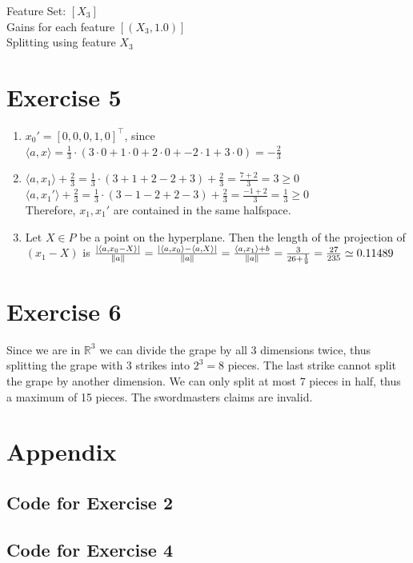 \documentclass[12pt]{article}
\DeclarePairedDelimiter\abs{\lvert}{\rvert}
\DeclarePairedDelimiter\Abs{\lVert}{\rVert}
\begin{document}
Feature Set: $[X_3]$ \\
Gains for each feature $[(X_3, 1.0)]$ \\
Splitting using feature $X_3$ \\

\section*{Exercise 5}
\begin{enumerate}[label=(\alph*)]
	\item	$x_0' = [0, 0, 0, 1, 0]^\top$, since $\langle a,x \rangle = \frac{1}{3} \cdot (3 \cdot 0 + 1 \cdot 0 + 2 \cdot 0 + -2 \cdot 1 + 3 \cdot 0) = -\frac{2}{3}$
	\item	$\langle a,x_1 \rangle + \frac{2}{3} = \frac{1}{3} \cdot (3+1+2-2+3) + \frac{2}{3} = \frac{7+2}{3} = 3 \geq 0$ \\
			$\langle a,x_1' \rangle + \frac{2}{3} = \frac{1}{3} \cdot (3-1-2+2-3) + \frac{2}{3} = \frac{-1+2}{3} = \frac{1}{3} \geq 0$ \\
			Therefore, $x_1,x_1'$ are contained in the same halfspace.
	\item	Let $X \in P$ be a point on the hyperplane. Then the length of the projection of $(x_1 - X)$ is $\frac{\abs{\langle a,x_0 - X \rangle}}{\Abs{a}} = \frac{\abs{\langle a,x_0 \rangle - \langle a,X \rangle}}{\Abs{a}} = \frac{\langle a,x_1 \rangle + b}{\Abs{a}} = \frac{3}{26 + \frac{1}{9}} = \frac{27}{235} \simeq 0.11489$
\end{enumerate}

\section*{Exercise 6}
Since we are in $\mathbb{R}^3$ we can divide the grape by all 3 dimensions twice, thus splitting the grape with 3 strikes into $2^3=8$ pieces. The last strike cannot split the grape by another dimension. We can only split at most 7 pieces in half, thus a maximum of 15 pieces. The swordmasters claims are invalid.

\section*{Appendix}\label{appendix}
\subsection*{Code for Exercise 2}


\subsection*{Code for Exercise 4}

\end{document}
